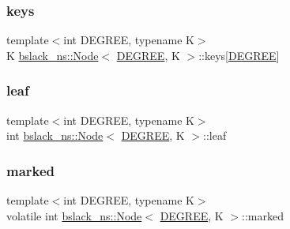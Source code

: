 \subsubsection{\texorpdfstring{keys}{keys}}
{\footnotesize\ttfamily template$<$int D\+E\+G\+R\+EE, typename K$>$ \\
K \hyperlink{structbslack__ns_1_1Node}{bslack\+\_\+ns\+::\+Node}$<$ \hyperlink{brown__sigouin__abtree__kcas_2adapter_8h_a5d88b17d70c985f2f2b8e987037fd6dd}{D\+E\+G\+R\+EE}, K $>$\+::keys\mbox{[}\hyperlink{brown__sigouin__abtree__kcas_2adapter_8h_a5d88b17d70c985f2f2b8e987037fd6dd}{D\+E\+G\+R\+EE}\mbox{]}}

\mbox{\label{structbslack__ns_1_1Node_a8cd3075dbf277f0c8f3d77d2b9b30d32}} 
\subsubsection{\texorpdfstring{leaf}{leaf}}
{\footnotesize\ttfamily template$<$int D\+E\+G\+R\+EE, typename K$>$ \\
int \hyperlink{structbslack__ns_1_1Node}{bslack\+\_\+ns\+::\+Node}$<$ \hyperlink{brown__sigouin__abtree__kcas_2adapter_8h_a5d88b17d70c985f2f2b8e987037fd6dd}{D\+E\+G\+R\+EE}, K $>$\+::leaf}

\mbox{\label{structbslack__ns_1_1Node_a97deb19c46b0be01965f1986c0f288f8}} 
\subsubsection{\texorpdfstring{marked}{marked}}
{\footnotesize\ttfamily template$<$int D\+E\+G\+R\+EE, typename K$>$ \\
volatile int \hyperlink{structbslack__ns_1_1Node}{bslack\+\_\+ns\+::\+Node}$<$ \hyperlink{brown__sigouin__abtree__kcas_2adapter_8h_a5d88b17d70c985f2f2b8e987037fd6dd}{D\+E\+G\+R\+EE}, K $>$\+::marked}

\mbox{\label{structbslack__ns_1_1Node_a0de8d925f3eb8033ec776c118b6e121a}} 
